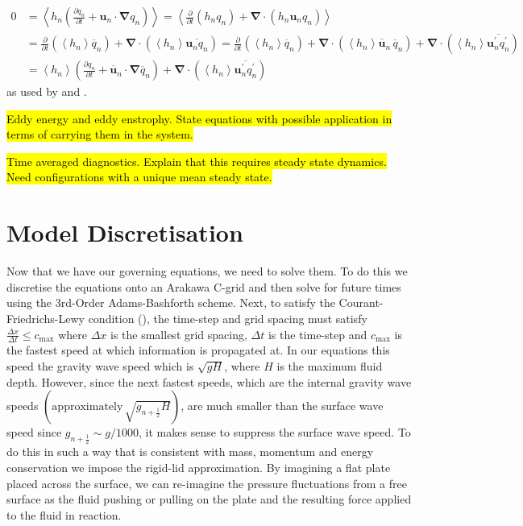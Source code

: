 \documentclass[10pt,a4paper]{report}
\newcommand*\thkmean[1]{\overline{#1}}
\newcommand*\thkres[1]{{#1}^{\prime}}
\newcommand*\nthkmean[1]{\left\langle{#1}\right\rangle}
\newcommand*{\half}{\frac{1}{2}}
\newcommand*{\partialdiff}[2][{}]{\frac{\partial #1}{\partial #2}}
\begin{document}
    \begin{equation}
    \begin{split}
    0&=\nthkmean{ h_{n} \left(\partialdiff[q_{n}]{t} + \boldsymbol{u}_{n} \cdot\boldsymbol{\nabla}q_{n} \right) } =
    \nthkmean{  \partialdiff{t}\left(h_{n}q_{n}\right) +  \boldsymbol{\nabla}\cdot\left(h_{n}\boldsymbol{u}_{n}q_{n} \right)}  \\
    &= \partialdiff{t} \left(\nthkmean{ h_{n} } \thkmean{q}_{n}\right)
    +  \boldsymbol{\nabla}\cdot\left( \nthkmean{ h_{n}}\thkmean{\boldsymbol{u}_{n}q_{n}} \right)
    = \partialdiff{t} \left(\nthkmean{h_{n}} \thkmean{q}_{n}\right) +  \boldsymbol{\nabla}\cdot\left( \nthkmean{h_{n}} \thkmean{\boldsymbol{u}}_{n} \, \thkmean{q}_{n} \right) +  \boldsymbol{\nabla}\cdot\left( \nthkmean{h_{n}} \thkmean{\thkres{\boldsymbol{u}}_{n}\thkres{q}_{n}} \right) \\
    &= \nthkmean{h_{n}} \left(\partialdiff[q_{n}]{t}+  \thkmean{\boldsymbol{u}}_{n}\cdot \boldsymbol{\nabla}\thkmean{q}_{n} \right) +  \boldsymbol{\nabla}\cdot\left( \nthkmean{h_{n}} \thkmean{\thkres{\boldsymbol{u}}_{n}\thkres{q}_{n}} \right)
    \end{split}
    \end{equation}
    as used by \cite{greatbatch1998exploring} and \cite{smith1999primitive}.
            
    \hl{Eddy energy and eddy enstrophy. State equations with 
    possible application in terms of carrying them in the system.}
    
    \hl{Time averaged diagnostics. Explain that this 
    requires steady state dynamics. Need configurations
    with a unique mean steady state.}
    

\section{Model Discretisation}

Now that we have our governing equations, we need to solve them. To do this we
discretise the equations onto an Arakawa C-grid and then solve for future times
using the 3rd-Order Adams-Bashforth scheme. Next, to satisfy the Courant-Friedrichs-Lewy
 condition (\cite{courant1928partiellen}), the time-step and grid spacing must satisfy $\frac{\Delta x}{\Delta t} \leq c_{\max}$ where $\Delta x$ is the smallest grid spacing, $\Delta t$ is
 the time-step and $c_{\max}$ is the fastest speed at which information is propagated at. 
 In our equations this speed the gravity wave speed which is $\sqrt{g H}$, where $H$ is the
 maximum fluid depth. However, since the next fastest speeds, which are the internal gravity
  wave speeds $\left(\mathrm{approximately} \, \sqrt{g_{n+\half} H}\right)$, are much smaller than the surface
  wave speed since $g_{n+\half} \sim g/1000$, it makes sense to suppress the surface 
  wave speed. To do this in such a way that is consistent with mass, momentum and energy 
  conservation we impose the rigid-lid approximation. By imagining a flat plate 
  placed across the surface, we can re-imagine the pressure fluctuations from a free
  surface as the fluid pushing or pulling on the plate and the resulting force 
  applied to the fluid in reaction. 
  
\end{document}
